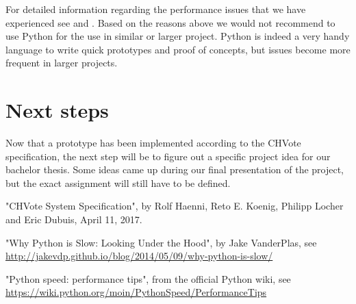 \documentclass[a4paper,12pt]{report}
\begin{document}
For detailed information regarding the performance issues that we have experienced see \cite{slowpy} and \cite{slowpy2}. Based on the reasons above we would not recommend to use Python for the use in similar or larger project. Python is indeed a very handy language to write quick prototypes and proof of concepts, but issues become more frequent in larger projects.

\clearpage
\section{Next steps}
Now that a prototype has been implemented according to the CHVote specification, the next step will be to figure out a specific project idea for our bachelor thesis. Some ideas came up during our final presentation of the project, but the exact assignment will still have to be defined.

\begin{thebibliography}{999}
	"CHVote System Specification", by Rolf Haenni, Reto E. Koenig, Philipp Locher and Eric Dubuis, April 11, 2017.

	"Why Python is Slow: Looking Under the Hood", by Jake VanderPlas, see \url{http://jakevdp.github.io/blog/2014/05/09/why-python-is-slow/}

	"Python speed: performance tips", from the official Python wiki, see \url{https://wiki.python.org/moin/PythonSpeed/PerformanceTips}
\end{thebibliography}
\end{document}
